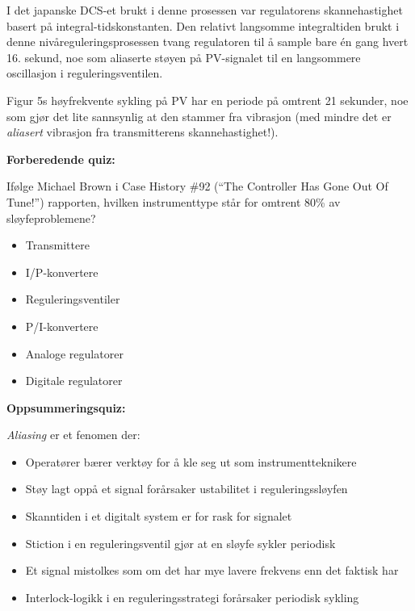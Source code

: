 \vskip 10pt

I det japanske DCS-et brukt i denne prosessen var regulatorens skannehastighet basert på integral-tidskonstanten. Den relativt langsomme integraltiden brukt i denne nivåreguleringsprosessen tvang regulatoren til å sample bare én gang hvert 16. sekund, noe som aliaserte støyen på PV-signalet til en langsommere oscillasjon i reguleringsventilen.

\vskip 10pt

Figur 5s høyfrekvente sykling på PV har en periode på omtrent 21 sekunder, noe som gjør det lite sannsynlig at den stammer fra vibrasjon (med mindre det er {\it aliasert} vibrasjon fra transmitterens skannehastighet!).















\vfil \eject

\noindent
{\bf Forberedende quiz:}

Ifølge Michael Brown i Case History \#92 (``The Controller Has Gone Out Of Tune!'') rapporten, hvilken instrumenttype står for omtrent 80\% av sløyfeproblemene?

\begin{itemize}
\item{} Transmittere
\vskip 10pt
\item{} I/P-konvertere
\vskip 10pt
\item{} Reguleringsventiler
\vskip 10pt
\item{} P/I-konvertere
\vskip 10pt
\item{} Analoge regulatorer
\vskip 10pt
\item{} Digitale regulatorer
\end{itemize}






\vfil \eject

\noindent
{\bf Oppsummeringsquiz:}

{\it Aliasing} er et fenomen der:

\begin{itemize}
\item{} Operatører bærer verktøy for å kle seg ut som instrumentteknikere
\vskip 5pt 
\item{} Støy lagt oppå et signal forårsaker ustabilitet i reguleringssløyfen
\vskip 5pt 
\item{} Skanntiden i et digitalt system er for rask for signalet
\vskip 5pt 
\item{} Stiction i en reguleringsventil gjør at en sløyfe sykler periodisk
\vskip 5pt 
\item{} Et signal mistolkes som om det har mye lavere frekvens enn det faktisk har
\vskip 5pt 
\item{} Interlock-logikk i en reguleringsstrategi forårsaker periodisk sykling
\end{itemize}




